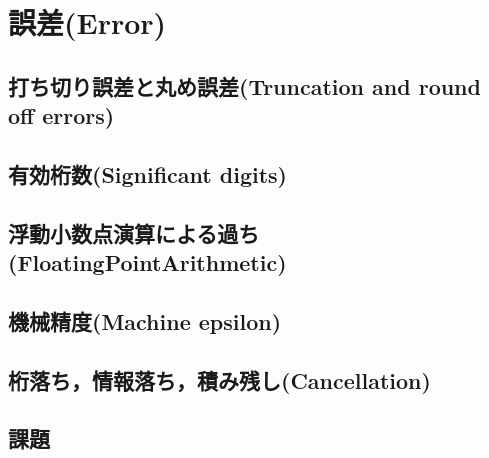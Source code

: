 \documentclass[10pt,a4j]{jreport}
\begin{document}
\chapter{誤差(Error)}
\section{打ち切り誤差と丸め誤差(Truncation and round off errors)}

\section{有効桁数(Significant digits)}

\section{浮動小数点演算による過ち(FloatingPointArithmetic)}

\section{機械精度(Machine epsilon)}

\section{桁落ち，情報落ち，積み残し(Cancellation)}

\section{課題}

\end{document}
